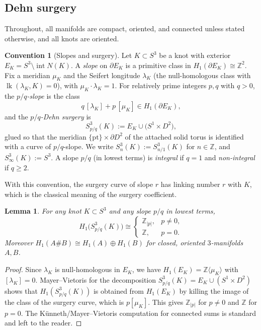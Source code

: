 \documentclass[11pt]{article}
\newtheorem{lemma}[theorem]{Lemma}
\theoremstyle{definition}
\newtheorem{convention}[theorem]{Convention}
\theoremstyle{remark}
\numberwithin{equation}{section}
\begin{document}
\subsection{Dehn surgery}

Throughout, all manifolds are compact, oriented, and connected unless
stated otherwise, and all knots are oriented.

\begin{convention}[Slopes and surgery]\label{conv:surgery}
Let $K\subset S^{3}$ be a knot with exterior
$E_{K}=S^{3}\setminus\operatorname{int}N(K)$.  A \emph{slope} on
$\partial E_{K}$ is a primitive class in $H_{1}(\partial E_{K})\cong
\mathbb{Z}^{2}$.  Fix a meridian $\mu_{K}$ and the Seifert longitude
$\lambda_{K}$ (the null-homologous class with
$\operatorname{lk}(\lambda_{K},K)=0$), with
$\mu_{K}\cdot\lambda_{K}=1$.  For relatively prime integers $p,q$ with
$q>0$, the \emph{$p/q$-slope} is the class
\[
q\,[\lambda_{K}]+p\,[\mu_{K}]\in H_{1}(\partial E_{K}),
\]
and the \emph{$p/q$-Dehn surgery} is
\[
S^{3}_{p/q}(K):=E_{K}\cup\bigl(S^{1}\times D^{2}\bigr),
\]
glued so that the meridian $\{\text{pt}\}\times\partial D^{2}$ of the
attached solid torus is identified with a curve of $p/q$-slope.  We write
$S^{3}_{n}(K):=S^{3}_{n/1}(K)$ for $n\in\mathbb{Z}$, and
$S^{3}_{\infty}(K):=S^{3}$.  A slope $p/q$ (in lowest terms) is
\emph{integral} if $q=1$ and \emph{non-integral} if $q\ge 2$.
\end{convention}

With this convention, the surgery curve of slope $r$ has linking number
$r$ with $K$, which is the classical meaning of the surgery coefficient.

\begin{lemma}\label{lem:H1}
For any knot $K\subset S^{3}$ and any slope $p/q$ in lowest terms,
\[
H_{1}\bigl(S^{3}_{p/q}(K)\bigr)\cong
\begin{cases}
\mathbb{Z}_{|p|}, & p\neq 0,\\[2pt]
\mathbb{Z}, & p=0.
\end{cases}
\]
Moreover $H_{1}(A\#B)\cong H_{1}(A)\oplus H_{1}(B)$ for closed, oriented
$3$-manifolds $A,B$.
\end{lemma}

\begin{proof}
Since $\lambda_{K}$ is null-homologous in $E_{K}$, we have
$H_{1}(E_{K})=\mathbb{Z}\langle\mu_{K}\rangle$ with
$[\lambda_{K}]=0$.  Mayer--Vietoris for the decomposition
$S^{3}_{p/q}(K)=E_{K}\cup(S^{1}\times D^{2})$ shows that
$H_{1}(S^{3}_{p/q}(K))$ is obtained from $H_{1}(E_{K})$ by killing the
image of the class of the surgery curve, which is
$p[\mu_{K}]$.  This gives $\mathbb{Z}_{|p|}$ for $p\neq0$ and
$\mathbb{Z}$ for $p=0$.  The Künneth/Mayer--Vietoris computation for
connected sums is standard and left to the reader.
\end{proof}
\end{document}
